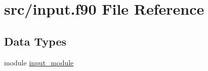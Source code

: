 \hypertarget{input_8f90}{\section{src/input.f90 File Reference}
\label{input_8f90}
}
\subsection*{Data Types}
\begin{DoxyCompactItemize}
\item 
module \hyperlink{classinput__module}{input\-\_\-module}
\end{DoxyCompactItemize}
